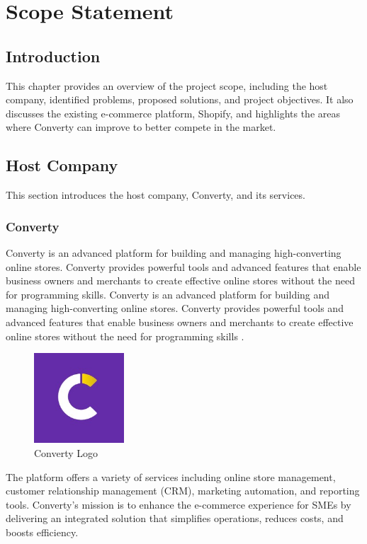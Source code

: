 \chapter{Scope Statement}
\setcounter{minitocdepth}{1}
\minitoc
\newpage
\setcounter{secnumdepth}{3}

\section{Introduction}
This chapter provides an overview of the project scope, including the host company, identified problems, proposed solutions, and project objectives. It also discusses the existing e-commerce platform, Shopify, and highlights the areas where Converty can improve to better compete in the market.

\section{Host Company}
This section introduces the host company, Converty, and its services.
\subsection{Converty}
Converty is an advanced platform for building and managing high-converting online stores. Converty provides powerful tools and advanced features that enable business owners and merchants to create effective online stores without the need for programming skills. Converty is an advanced platform for building and managing high-converting online stores. Converty provides powerful tools and advanced features that enable business owners and merchants to create effective online stores without the need for programming skills \cite{convertywebsite}.

\begin{figure}[H]
  \centering
  \includegraphics[width=0.3\textwidth]{Images/convertyLogo.jpeg}
  \caption{Converty Logo}
  \label{fig:Converty Logo}
\end{figure}

The platform offers a variety of services including online store management, customer relationship management (CRM), marketing automation, and reporting tools. Converty's mission is to enhance the e-commerce experience for SMEs by delivering an integrated solution that simplifies operations, reduces costs, and boosts efficiency.
\newline

